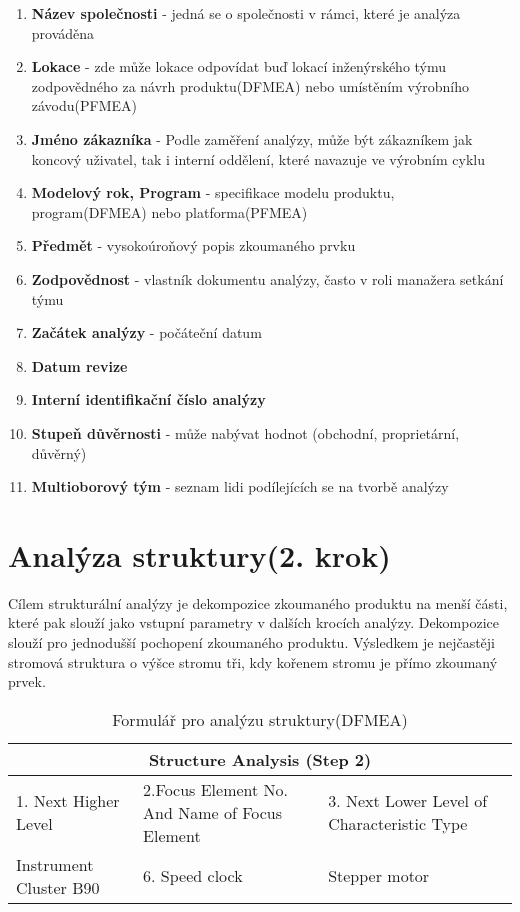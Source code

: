 \begin{enumerate}
	\item \textbf{Název společnosti} - jedná se o společnosti v rámci, které je analýza prováděna
	\item \textbf{Lokace} - zde může lokace odpovídat buď lokací inženýrského týmu zodpovědného za návrh produktu(DFMEA) nebo umístěním výrobního závodu(PFMEA) 
	\item \textbf{Jméno zákazníka} - Podle zaměření analýzy, může být zákazníkem jak koncový uživatel, tak i interní oddělení, které navazuje ve výrobním cyklu
 \item \textbf{Modelový rok, Program} - specifikace modelu produktu, program(DFMEA) nebo platforma(PFMEA)
 \item \textbf{Předmět} - vysokoúroňový popis zkoumaného prvku
 \item \textbf{Zodpovědnost} - vlastník dokumentu analýzy, často v roli manažera setkání týmu
 \item \textbf{Začátek analýzy} - počáteční datum
 \item \textbf{Datum revize} 
 \item \textbf{Interní identifikační číslo analýzy}
 \item \textbf{Stupeň důvěrnosti} - může nabývat hodnot (obchodní, proprietární, důvěrný)
 \item \textbf{Multioborový tým} - seznam lidi podílejících se na tvorbě analýzy
\end{enumerate}

\section{Analýza struktury(2. krok)}
\label{sec:FMEA_postup_2}
Cílem strukturální analýzy je dekompozice zkoumaného produktu na menší části, které pak slouží jako vstupní parametry v dalších krocích analýzy. Dekompozice slouží pro jednodušší pochopení zkoumaného produktu. Výsledkem je nejčastěji stromová struktura o výšce stromu tři, kdy kořenem stromu je přímo zkoumaný prvek.





\begin{center}
\begin{table}[h]
	\centering
	\caption{Formulář pro analýzu struktury(DFMEA) }
	\label{tab:structure_DFMEA}
\begin{tabular}{ |p{4cm}|p{3cm}|p{3cm}|  }
 \hline
 \multicolumn{3}{|c|}{Structure Analysis (Step 2)} \\
 \hline
 1. Next Higher Level& 2.Focus Element
No. And Name of Focus Element &3. Next Lower Level of Characteristic Type\\
 \hline
 Instrument Cluster B90   & 6. Speed clock    &Stepper motor\\


 \hline
\end{tabular}\  
\end{table}
\end{center}

